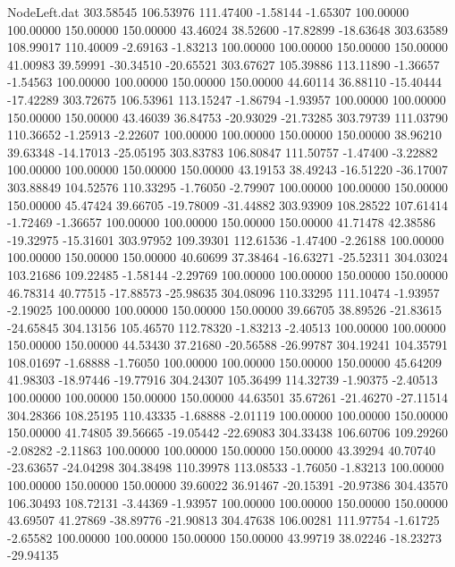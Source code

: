\begin{filecontents}{NodeLeft.dat}
 303.58545  106.53976  111.47400    -1.58144   -1.65307  100.00000  100.00000  150.00000  150.00000   43.46024   38.52600  -17.82899  -18.63648
 303.63589  108.99017  110.40009    -2.69163   -1.83213  100.00000  100.00000  150.00000  150.00000   41.00983   39.59991  -30.34510  -20.65521
 303.67627  105.39886  113.11890    -1.36657   -1.54563  100.00000  100.00000  150.00000  150.00000   44.60114   36.88110  -15.40444  -17.42289
 303.72675  106.53961  113.15247    -1.86794   -1.93957  100.00000  100.00000  150.00000  150.00000   43.46039   36.84753  -20.93029  -21.73285
 303.79739  111.03790  110.36652    -1.25913   -2.22607  100.00000  100.00000  150.00000  150.00000   38.96210   39.63348  -14.17013  -25.05195
 303.83783  106.80847  111.50757    -1.47400   -3.22882  100.00000  100.00000  150.00000  150.00000   43.19153   38.49243  -16.51220  -36.17007
 303.88849  104.52576  110.33295    -1.76050   -2.79907  100.00000  100.00000  150.00000  150.00000   45.47424   39.66705  -19.78009  -31.44882
 303.93909  108.28522  107.61414    -1.72469   -1.36657  100.00000  100.00000  150.00000  150.00000   41.71478   42.38586  -19.32975  -15.31601
 303.97952  109.39301  112.61536    -1.47400   -2.26188  100.00000  100.00000  150.00000  150.00000   40.60699   37.38464  -16.63271  -25.52311
 304.03024  103.21686  109.22485    -1.58144   -2.29769  100.00000  100.00000  150.00000  150.00000   46.78314   40.77515  -17.88573  -25.98635
 304.08096  110.33295  111.10474    -1.93957   -2.19025  100.00000  100.00000  150.00000  150.00000   39.66705   38.89526  -21.83615  -24.65845
 304.13156  105.46570  112.78320    -1.83213   -2.40513  100.00000  100.00000  150.00000  150.00000   44.53430   37.21680  -20.56588  -26.99787
 304.19241  104.35791  108.01697    -1.68888   -1.76050  100.00000  100.00000  150.00000  150.00000   45.64209   41.98303  -18.97446  -19.77916
 304.24307  105.36499  114.32739    -1.90375   -2.40513  100.00000  100.00000  150.00000  150.00000   44.63501   35.67261  -21.46270  -27.11514
 304.28366  108.25195  110.43335    -1.68888   -2.01119  100.00000  100.00000  150.00000  150.00000   41.74805   39.56665  -19.05442  -22.69083
 304.33438  106.60706  109.29260    -2.08282   -2.11863  100.00000  100.00000  150.00000  150.00000   43.39294   40.70740  -23.63657  -24.04298
 304.38498  110.39978  113.08533    -1.76050   -1.83213  100.00000  100.00000  150.00000  150.00000   39.60022   36.91467  -20.15391  -20.97386
 304.43570  106.30493  108.72131    -3.44369   -1.93957  100.00000  100.00000  150.00000  150.00000   43.69507   41.27869  -38.89776  -21.90813
 304.47638  106.00281  111.97754    -1.61725   -2.65582  100.00000  100.00000  150.00000  150.00000   43.99719   38.02246  -18.23273  -29.94135

\end{filecontents}
